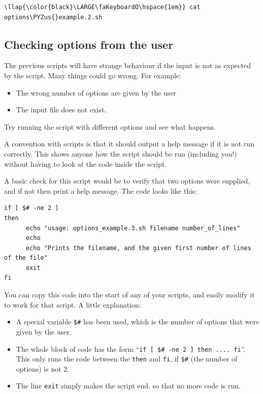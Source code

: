 \documentclass[11pt]{article}
\providecommand{\tightlist}{%
      \setlength{\itemsep}{0pt}\setlength{\parskip}{0pt}}
\def\PYZus{\char`\_}
\begin{document}
\begin{terminalinput}
\begin{Verbatim}[commandchars=\\\{\}]
\llap{\color{black}\LARGE\faKeyboardO\hspace{1em}} cat options\PYZus{}example.2.sh
\end{Verbatim}
\end{terminalinput}

    \hypertarget{checking-options-from-the-user}{%
\subsection{Checking options from the
user}\label{checking-options-from-the-user}}

The previous scripts will have strange behaviour if the input is not as
expected by the script. Many things could go wrong. For example:

\begin{itemize}
\tightlist
\item
  The wrong number of options are given by the user
\item
  The input file does not exist.
\end{itemize}

Try running the script with different options and see what happens.

A convention with scripts is that it should output a help message if it
is not run correctly. This shows anyone how the script should be run
(including you!) without having to look at the code inside the script.



\newpage



A basic check for this script would be to verify that two options were
supplied, and if not then print a help message. The code looks like
this:

\begin{verbatim}
if [ $# -ne 2 ]
then
      echo "usage: options_example.3.sh filename number_of_lines"
      echo
      echo "Prints the filename, and the given first number of lines of the file"
      exit
fi
\end{verbatim}

You can copy this code into the start of any of your scripts, and easily
modify it to work for that script. A little explanation:

\begin{itemize}
\tightlist
\item
  A special variable \texttt{\$\#} has been used, which is the number of
  options that were given by the user.
\item
  The whole block of code has the form
  ``\texttt{if\ {[}\ \$\#\ -ne\ 2\ {]}\ then\ ....\ fi}''. This only
  runs the code between the \texttt{then} and \texttt{fi}, if
  \texttt{\$\#} (the number of options) is not 2.
\item
  The line \texttt{exit} simply makes the script end, so that no more
  code is run.
\end{itemize}
\end{document}
